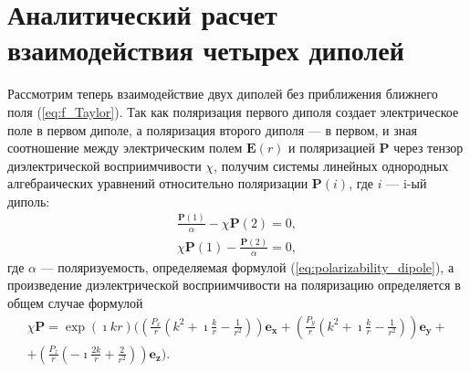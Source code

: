 \section{Аналитический расчет взаимодействия четырех диполей}
Рассмотрим теперь взаимодействие двух диполей без приближения ближнего поля (\ref{eq:f_Taylor}). Так как поляризация первого диполя создает электрическое поле в первом диполе, а поляризация второго диполя --- в первом, и зная соотношение между электрическим полем $ \textbf{E} (r) $ и поляризацией $ \textbf{P} $ через тензор диэлектрической восприимчивости $ \chi $, получим системы линейных однородных алгебраических уравнений относительно поляризации $ \textbf{P} (i) $, где $ i $ --- i-ый диполь:
\begin{subequations}
\begin{gather}
\frac{\textbf{P}(1)}{\alpha} - \chi \textbf{P}(2) = 0, \label{eq:linear_eq_P1} \\
\chi \textbf{P}(1) -  \frac{\textbf{P}(2)}{\alpha} = 0, \label{eq:linear_eq_P2} 
\end{gather}
\end{subequations}
где $ \alpha $ --- поляризуемость, определяемая формулой (\ref{eq:polarizability_dipole}), а произведение диэлектрической восприимчивости на поляризацию определяется в общем случае формулой
\begin{multline}
\chi \textbf{P} = \exp (\imath k r) \Bigg( \left( \frac{P_x}{r} \left( k^2 + \imath \frac{k}{r} - \frac{1}{r^2} \right) \right) \mathbf{e_x} + \left( \frac{P_y}{r} \left( k^2 + \imath \frac{k}{r} - \frac{1}{r^2} \right) \right) \mathbf{e_y} + \\
+ \left( \frac{P_z}{r} \left( - \imath \frac{2 k}{r} + \frac{2}{r^2} \right) \right) \mathbf{e_z} \Bigg).
\label{eq:2D_susceptibility}
\end{multline}